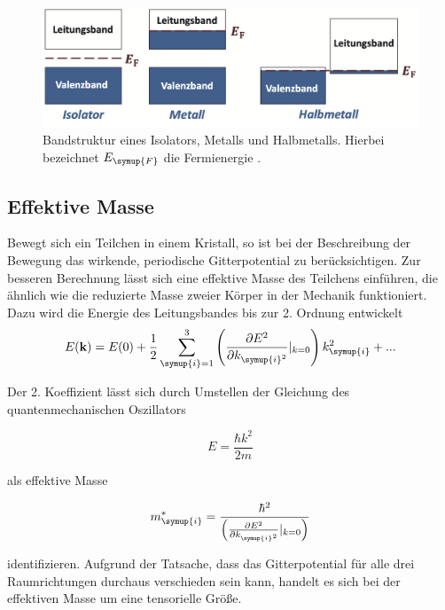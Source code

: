 \begin{figure}
    \centering
    \includegraphics[width=\textwidth]{content/pics/Bandstruktur.png}
    \caption{Bandstruktur eines Isolators, Metalls und Halbmetalls. Hierbei bezeichnet $E_{\symup{F}}$ die Fermienergie \cite{GrossMarx2018}.}
    \label{fig:Bandstruktur}
\end{figure}

\subsection{Effektive Masse}
\label{subsec:Effektive Masse}
Bewegt sich ein Teilchen in einem Kristall, so ist bei der Beschreibung der Bewegung das wirkende, periodische Gitterpotential zu berücksichtigen. Zur besseren Berechnung lässt
sich eine effektive Masse des Teilchens einführen, die ähnlich wie die reduzierte Masse zweier Körper in der Mechanik funktioniert.
Dazu wird die Energie des Leitungsbandes bis zur 2. Ordnung entwickelt
\begin{equation*}
    E(\mathbf{k}) = E(0) + \frac{1}{2}\sum_{\symup{i}=1}^{3}\left(\frac{\partial E^2}{\partial k_{\symup{i}^2}}|_{k=0}\right) k_{\symup{i}}^2 + ...
\end{equation*}

Der 2. Koeffizient lässt sich durch Umstellen der Gleichung des quantenmechanischen Oszillators 

\begin{equation*}
    E = \frac{\hbar k^2}{2m}
\end{equation*}

als effektive Masse

\begin{equation*}
    m_{\symup{i}}^{*}=\frac{\hbar^2}{\left(\frac{\partial E^2}{\partial k_{\symup{i}^2}}|_{k=0}\right)}
\end{equation*}

identifizieren. Aufgrund der Tatsache, dass das Gitterpotential für alle drei Raumrichtungen durchaus verschieden sein kann, handelt es sich bei der effektiven Masse um eine 
tensorielle Größe.


